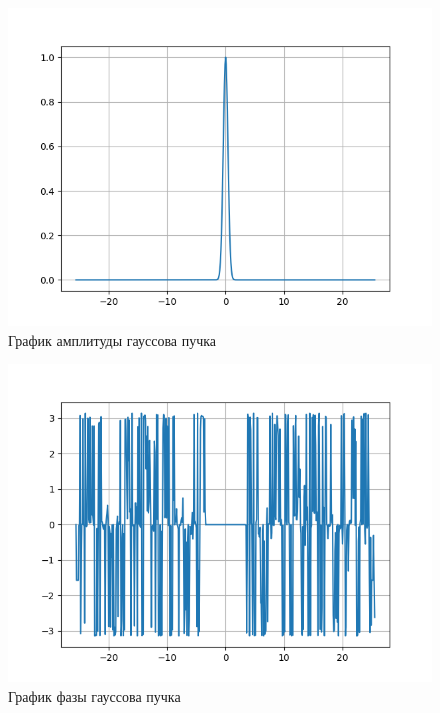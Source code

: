 {\begin{enumerate}
{			\begin{figure}[H]
				\begin{center}
				\includegraphics[scale=0.7]{Amplitude_gauss}
				\caption{График амплитуды гауссова пучка}
				\label{gauss_ampl}
			\end{center}
			\end{figure}
		
			\begin{figure}[H]
				\begin{center}
				\includegraphics[scale=0.7]{Phase_gauss}
				\caption{График фазы гауссова пучка}
				\label{gauss_phase}
				\end{center}
			\end{figure}
		}
		

\end{enumerate}}
